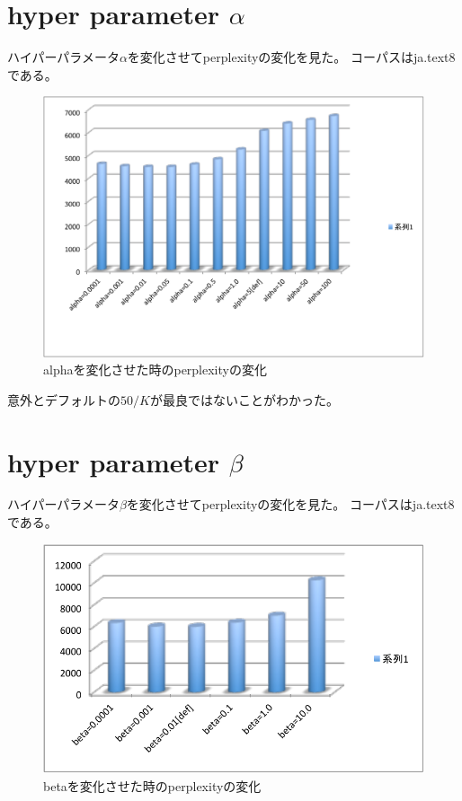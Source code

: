 \documentclass[uplatex,dvipdfmx]{jsarticle}
\begin{document}
\section{hyper parameter $\alpha$}
ハイパーパラメータ$\alpha$を変化させてperplexityの変化を見た。
コーパスはja.text8である。

\begin{figure}[htb]
\includegraphics[width=16cm,pagebox=cropbox]{jatext8alpha.pdf}
\caption{alphaを変化させた時のperplexityの変化}
\end{figure}

意外とデフォルトの$50/K$が最良ではないことがわかった。

\section{hyper parameter $\beta$}
ハイパーパラメータ$\beta$を変化させてperplexityの変化を見た。
コーパスはja.text8である。

\begin{figure}[htb]
\includegraphics[width=16cm,pagebox=cropbox]{jatext8beta.pdf}
\caption{betaを変化させた時のperplexityの変化}
\end{figure}
\end{document}
